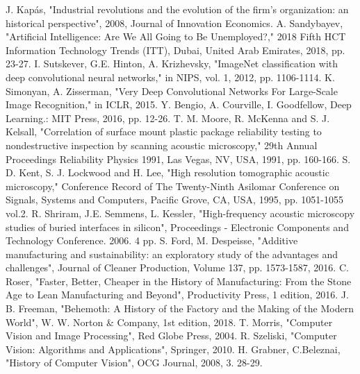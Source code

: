 \documentclass[12pt,a4paper,twoside]{report}
\begin{document}
\begin{thebibliography}{1}
J. Kapás, "Industrial revolutions and the evolution of the firm's organization: an historical perspective", 2008, Journal of Innovation Economics.
A. Sandybayev, "Artificial Intelligence: Are We All Going to Be Unemployed?," 2018 Fifth HCT Information Technology Trends (ITT), Dubai, United Arab Emirates, 2018, pp. 23-27.
I. Sutskever, G.E. Hinton, A. Krizhevsky, "ImageNet classification with deep convolutional neural networks," in NIPS, vol. 1, 2012, pp. 1106-1114.
K. Simonyan, A. Zisserman, "Very Deep Convolutional Networks For Large-Scale Image Recognition," in ICLR, 2015.
Y. Bengio, A. Courville, I. Goodfellow, Deep Learning.: MIT Press, 2016, pp. 12-26.
T. M. Moore, R. McKenna and S. J. Kelsall, "Correlation of surface mount plastic package reliability testing to nondestructive inspection by scanning acoustic microscopy," 29th Annual Proceedings Reliability Physics 1991, Las Vegas, NV, USA, 1991, pp. 160-166.
S. D. Kent, S. J. Lockwood and H. Lee, "High resolution tomographic acoustic microscopy," Conference Record of The Twenty-Ninth Asilomar Conference on Signals, Systems and Computers, Pacific Grove, CA, USA, 1995, pp. 1051-1055 vol.2.
R. Shriram, J.E. Semmens, L. Kessler, "High-frequency acoustic microscopy studies of buried interfaces in silicon", Proceedings - Electronic Components and Technology Conference. 2006. 4 pp.
S. Ford, M. Despeisse, "Additive manufacturing and sustainability: an exploratory study of the advantages and challenges", Journal of Cleaner Production, Volume 137, pp. 1573-1587, 2016.
C. Roser, "Faster, Better, Cheaper in the History of Manufacturing: From the Stone Age to Lean Manufacturing and Beyond", Productivity Press, 1 edition, 2016.
J. B. Freeman, "Behemoth: A History of the Factory and the Making of the Modern World", W. W. Norton \& Company, 1st edition, 2018.
T. Morris, "Computer Vision and Image Processing", Red Globe Press, 2004.
R. Szeliski, "Computer Vision: Algorithms and Applications", Springer, 2010.
H. Grabner, C.Beleznai, "History of Computer Vision", OCG Journal, 2008, 3. 28-29. 

\end{thebibliography}
\end{document}
